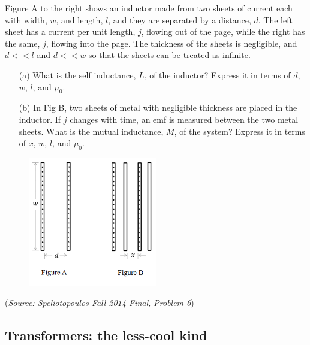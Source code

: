 \documentclass{article}
\begin{document}
Figure A to the right shows an inductor made from two sheets of current each with width, $w$, and length, $l$, and they are separated by a distance, $d$. The left sheet has a current per unit length, $j$, flowing out of the page, while the right has the same, $j$, flowing into the page. The thickness of the sheets is negligible, and $d<<l$ and $d<<w$ so that the sheets can be treated as infinite.
\begin{itemize}
	\item[(a)] What is the self inductance, $L$, of the inductor? Express it in terms of $d$, $w$, $l$, and $\mu_0$.
	\item[(b)] In Fig B, two sheets of metal with negligible thickness are placed in the inductor. If $j$ changes with time, an emf is measured between the two metal sheets. What is the mutual inductance, $M$, of the system? Express it in terms of $x$, $w$, $l$, and $\mu_0$.
\end{itemize}
\begin{figure}[h]
	\begin{center}
		\includegraphics[width=0.5\textwidth]{Sheets.png}
	\end{center}
\end{figure}

(\textit{Source: Speliotopoulos Fall 2014 Final, Problem 6})

\subsection{Transformers: the less-cool kind}
\end{document}
